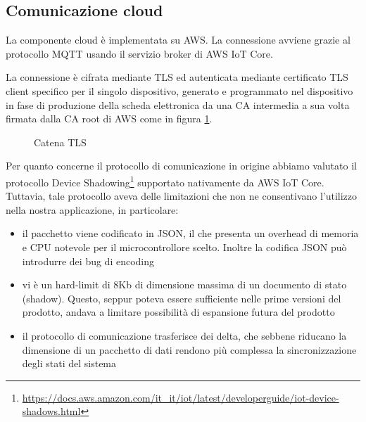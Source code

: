 \documentclass{article}
\begin{document}
\subsection{Comunicazione cloud}

La componente cloud è implementata su AWS. La connessione avviene grazie al protocollo
MQTT usando il servizio broker di AWS IoT Core.

La connessione è cifrata mediante TLS ed autenticata mediante certificato TLS client
specifico per il singolo dispositivo, generato e programmato nel dispositivo in fase
di produzione della scheda elettronica da una CA intermedia a sua volta firmata dalla
CA root di AWS come in figura \ref{tls-chain}.

\begin{figure}[ht]
    \centering
    \caption{Catena TLS}
    \label{tls-chain}
\end{figure}

Per quanto concerne il protocollo di comunicazione in origine abbiamo valutato il 
protocollo Device Shadowing\footnote{\url{https://docs.aws.amazon.com/it\_it/iot/latest/developerguide/iot-device-shadows.html}} supportato nativamente da AWS IoT Core. Tuttavia, tale 
protocollo aveva delle limitazioni che non ne consentivano l'utilizzo nella nostra 
applicazione, in particolare:

\begin{itemize}
    \item il pacchetto viene codificato in JSON, il che presenta un overhead di memoria 
        e CPU notevole per il microcontrollore scelto. Inoltre la codifica JSON può 
        introdurre dei bug di encoding
    \item vi è un hard-limit di 8Kb di dimensione massima di un documento di stato (shadow). 
        Questo, seppur poteva essere sufficiente nelle prime versioni del prodotto, andava 
        a limitare possibilità di espansione futura del prodotto
    \item il protocollo di comunicazione trasferisce dei delta, che sebbene riducano la 
        dimensione di un pacchetto di dati rendono più complessa la sincronizzazione degli 
        stati del sistema
\end{itemize}
\end{document}
